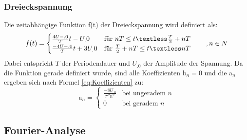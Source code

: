 \subsubsection{Dreieckspannung}
Die zeitabhängige Funktion f(t) der Dreieckspannung wird definiert als:
\[
f(t)=
	\begin{cases}
     \frac{4U-.0}{T}t-U_.0 & \text{für } nT \le t \textless \frac{T}{2}+nT\\
     \frac{-4U-.0}{T}t+3U_.0 & \text{für } \frac{T}{2}+nT \le t \textless nT
   	\end{cases}
\hspace{2em},n\in N
\]
Dabei entspricht $T$ der Periodendauer und $U_.0$ der Amplitude der Spannung. Da die Funktion gerade definiert wurde, sind alle Koeffizienten $\mathrm{b}_n=0$ und die $\mathrm{a}_n$ ergeben sich nach Formel \eqref{eq:Koeffizienten} zu:
\begin{equation}
\mathrm{a}_n =
	\begin{cases} 
	\frac{-8U_.0}{\pi^2 n^2} & \text{bei ungeradem }n\\
	0 & \text{bei geradem }n
	\end{cases}
\end{equation}

\subsection{Fourier-Analyse}
